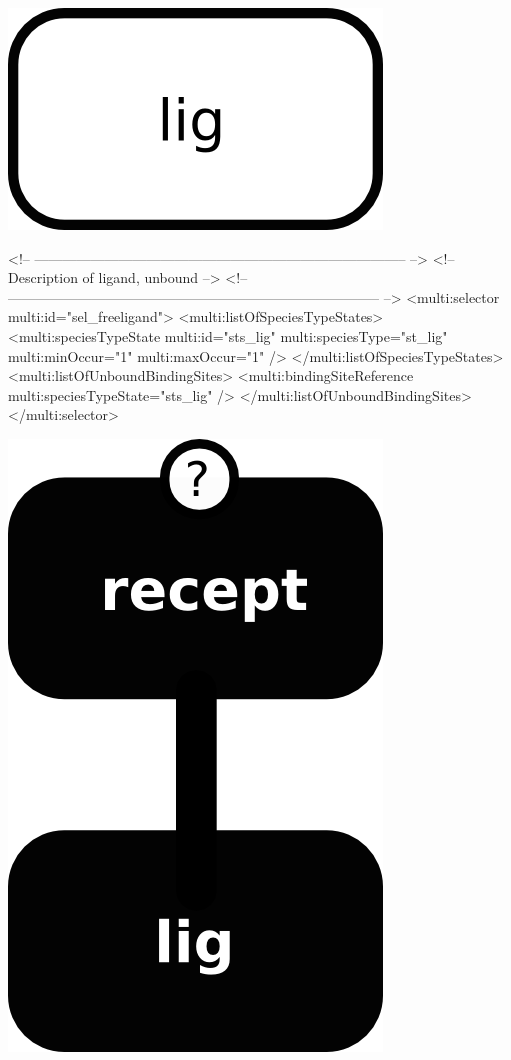 \includegraphics{figs/pngs/sel_freeligand.png}

\begin{example}
<!-- -------------------------------------------------------------------------------- -->
<!-- Description of ligand, unbound                                                   -->
<!-- -------------------------------------------------------------------------------- -->
      <multi:selector multi:id="sel_freeligand">
        <multi:listOfSpeciesTypeStates>
          <multi:speciesTypeState multi:id="sts_lig" multi:speciesType="st_lig" 
                                   multi:minOccur="1" multi:maxOccur="1" />
        </multi:listOfSpeciesTypeStates>
        <multi:listOfUnboundBindingSites>
          <multi:bindingSiteReference multi:speciesTypeState="sts_lig" />
        </multi:listOfUnboundBindingSites>
      </multi:selector>
\end{example}

\includegraphics{figs/pngs/sel_complex.png}

